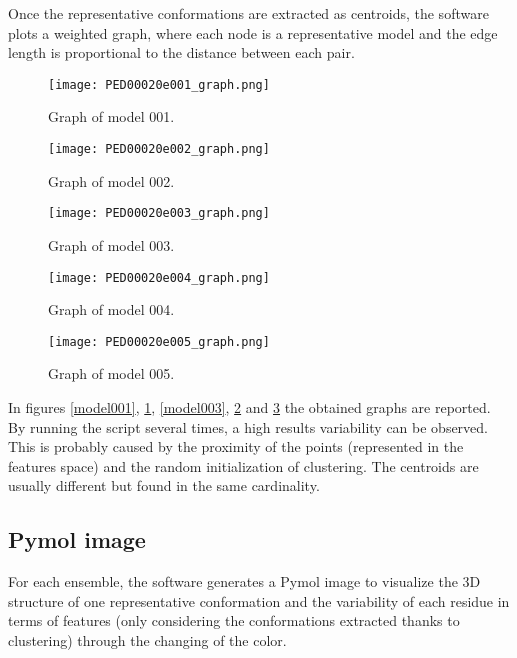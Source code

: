 Once the representative conformations are extracted as centroids, the software plots a weighted graph, where each node is a representative model and the edge length is proportional to the distance between each pair. 



\begin{figure}[H]
	\begin{minipage}[b]{0.47\textwidth}
		\centering
		\texttt{[image: PED00020e001\_graph.png]}
		\caption{Graph of model 001.}
		\label{model001}
	\end{minipage}
	\hfill
	\begin{minipage}[b]{0.47\textwidth}
		\centering
		\texttt{[image: PED00020e002\_graph.png]}
		\caption{Graph of model 002.}
		\label{model002}
	\end{minipage}
\end{figure}
\begin{figure}[H]
	\begin{minipage}[b]{0.47\textwidth}
		\centering
		\texttt{[image: PED00020e003\_graph.png]}
		\caption{Graph of model 003.}
		\label{model003}
	\end{minipage}
	\begin{minipage}[b]{0.47\textwidth}
		\centering
		\texttt{[image: PED00020e004\_graph.png]}
		\caption{Graph of model 004.}
		\label{model004}
	\end{minipage}
\end{figure}
\begin{figure}[H]
	\begin{minipage}[b]{0.47\textwidth}
		\centering
		\texttt{[image: PED00020e005\_graph.png]}
		\caption{Graph of model 005.}
		\label{model005}
	\end{minipage}
	\end{figure}

In figures \ref{model001}, \ref{model002}, \ref{model003}, \ref{model004} and \ref{model005} the obtained graphs are reported. By running the script several times, a high results variability can be observed.
This is probably caused by the proximity of the points (represented in the features space) and the random initialization of clustering. The centroids are usually different but found in the same cardinality.



\subsection{Pymol image}
For each ensemble, the software generates a Pymol image to visualize the 3D structure of one representative conformation and the variability of each residue in terms of features (only considering the conformations extracted thanks to clustering) through the changing of the color.

